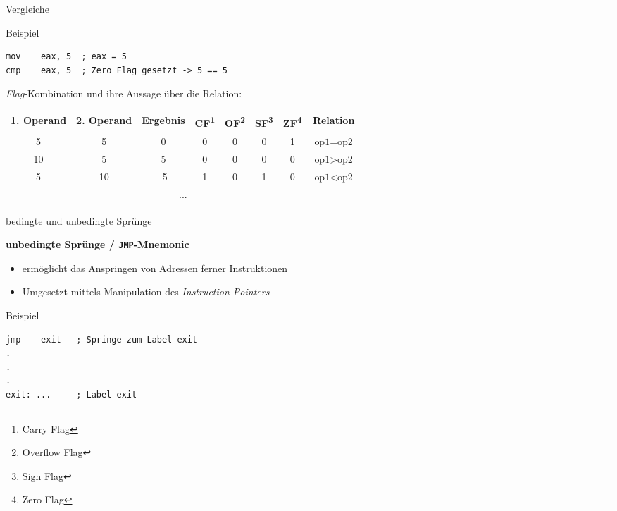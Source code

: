 \begin{frame}[fragile]{Vergleiche}

Beispiel
\begin{lstlisting}
mov    eax, 5  ; eax = 5
cmp    eax, 5  ; Zero Flag gesetzt -> 5 == 5
\end{lstlisting}

\makebox{}

\textit{Flag}-Kombination und ihre Aussage über die Relation:

\makebox{}

\begin{small}
\begin{tabular}{|c|c|c|c|c|c|c|c|}
\hline
1. Operand & 2. Operand & Ergebnis & 
CF\footnote{Carry Flag} & 
OF\footnote{Overflow Flag} & 
SF\footnote{Sign Flag} &
ZF\footnote{Zero Flag}
& Relation \\ \hline 
5          & 5          & 0        & 0  & 0  & 0  & 1  & $\text{op1} = \text{op2}$ \\ \hline
10         & 5          & 5        & 0  & 0  & 0  & 0  & $\text{op1} > \text{op2}$ \\ \hline
5          & 10         & -5       & 1  & 0  & 1  & 0  & $\text{op1} < \text{op2}$ \\ \hline
\multicolumn{8}{|c|}{...} \\ \hline
\end{tabular}
\end{small}

\end{frame}

\begin{frame}[fragile]{bedingte und unbedingte Sprünge}

\begin{center}
\textbf{unbedingte Sprünge / \texttt{JMP}-Mnemonic}
\end{center}

\begin{itemize}
	\item ermöglicht das Anspringen von Adressen ferner Instruktionen
	\item Umgesetzt mittels Manipulation des \textit{Instruction Pointers}
\end{itemize}

\makebox{}

Beispiel
\begin{lstlisting}
jmp    exit   ; Springe zum Label exit
.
.
.
exit: ...     ; Label exit
\end{lstlisting}
\end{frame}

